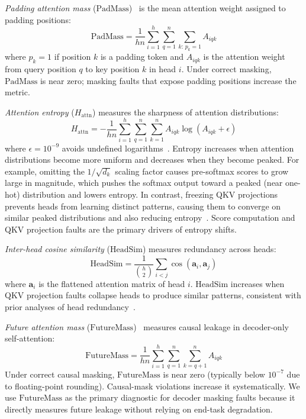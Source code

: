 \emph{Padding attention mass} ($\mathrm{PadMass}$)~\citep{dao2022flashattention,vaswani2017attention} is the mean attention weight assigned to padding positions:
\begin{equation}
\mathrm{PadMass} = \frac{1}{h n} \sum_{i=1}^{h} \sum_{q=1}^{n} \sum_{k:\, p_k = 1} A_{iqk}
\label{eq:padmass}
\end{equation}
where $p_k = 1$ if position $k$ is a padding token and $A_{iqk}$ is the attention weight from query position $q$ to key position $k$ in head $i$. Under correct masking, $\mathrm{PadMass}$ is near zero; masking faults that expose padding positions increase the metric.

\emph{Attention entropy} ($H_{\text{attn}}$) measures the sharpness of attention distributions:
\begin{equation}
H_{\text{attn}} = -\frac{1}{h n} \sum_{i=1}^{h} \sum_{q=1}^{n} \sum_{k=1}^{n} A_{iqk} \log (A_{iqk} + \epsilon)
\label{eq:entropy}
\end{equation}
where $\epsilon = 10^{-9}$ avoids undefined logarithms~\citep{attentioncollapse}. Entropy increases when attention distributions become more uniform and decreases when they become peaked. For example, omitting the $1/\sqrt{d_k}$ scaling factor causes pre-softmax scores to grow large in magnitude, which pushes the softmax output toward a peaked (near one-hot) distribution and lowers entropy. In contrast, freezing QKV projections prevents heads from learning distinct patterns, causing them to converge on similar peaked distributions and also reducing entropy~\citep{voita2019analyzing}. Score computation and QKV projection faults are the primary drivers of entropy shifts.

\emph{Inter-head cosine similarity} ($\mathrm{HeadSim}$) measures redundancy across heads:
\begin{equation}
\mathrm{HeadSim} = \frac{1}{\binom{h}{2}} \sum_{i < j} \cos(\mathbf{a}_i, \mathbf{a}_j)
\label{eq:headsim}
\end{equation}
where $\mathbf{a}_i$ is the flattened attention matrix of head $i$. $\mathrm{HeadSim}$ increases when QKV projection faults collapse heads to produce similar patterns, consistent with prior analyses of head redundancy~\citep{michel2019sixteen,voita2019analyzing}.

\emph{Future attention mass} ($\mathrm{FutureMass}$)~\citep{vaswani2017attention} measures causal leakage in decoder-only self-attention:
\begin{equation}
\mathrm{FutureMass} = \frac{1}{h n}\sum_{i=1}^{h}\sum_{q=1}^{n}\sum_{k=q+1}^{n} A_{iqk}
\label{eq:futuremass}
\end{equation}
Under correct causal masking, $\mathrm{FutureMass}$ is near zero (typically below $10^{-7}$ due to floating-point rounding). Causal-mask violations increase it systematically. We use $\mathrm{FutureMass}$ as the primary diagnostic for decoder masking faults because it directly measures future leakage without relying on end-task degradation.

